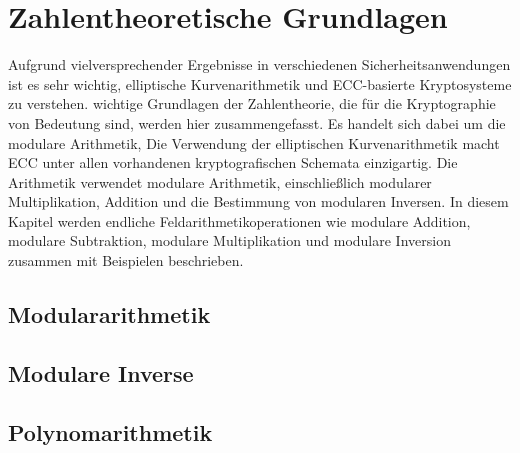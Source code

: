\chapter{Zahlentheoretische Grundlagen}

Aufgrund vielversprechender Ergebnisse in verschiedenen Sicherheitsanwendungen ist es sehr wichtig, elliptische Kurvenarithmetik und ECC-basierte Kryptosysteme zu verstehen. wichtige Grundlagen
der Zahlentheorie, die für die Kryptographie von Bedeutung sind, werden hier
zusammengefasst. Es handelt sich dabei um die modulare Arithmetik, Die Verwendung der elliptischen Kurvenarithmetik macht ECC unter allen vorhandenen kryptografischen Schemata einzigartig. Die Arithmetik verwendet modulare Arithmetik, einschließlich modularer Multiplikation, Addition und die Bestimmung
von modularen Inversen. In diesem Kapitel werden endliche Feldarithmetikoperationen wie modulare Addition, modulare Subtraktion, modulare Multiplikation und modulare Inversion zusammen mit Beispielen beschrieben.

\section{Modulararithmetik}



\section{Modulare Inverse}



\section{Polynomarithmetik}